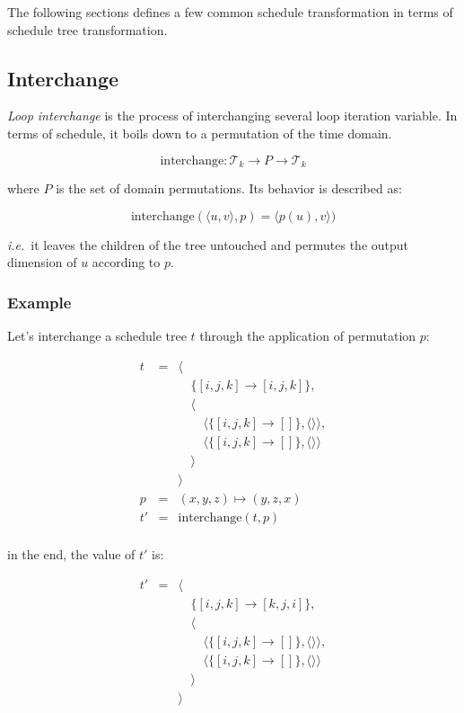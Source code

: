 \documentclass{article}
\begin{document}
The following sections defines a few common schedule transformation in terms of schedule tree transformation.

\subsection{Interchange}

\emph{Loop interchange} is the process of interchanging several loop iteration
variable. In terms of schedule, it boils down to a permutation of the time
domain.

\[
    \mathrm{interchange}: \mathcal{T}_k \rightarrow P \rightarrow \mathcal{T}_k
\]

\noindent where $P$ is the set of domain permutations. Its behavior is described as:

\[
    \mathrm{interchange}(\langle u, v\rangle, p) = \langle p(u), v\rangle)
\]

\noindent \emph{i.e.}\ it leaves the children of the tree untouched and
permutes the output dimension of $u$ according to $p$.

\subsubsection*{Example}

Let's interchange a schedule tree $t$ through the application of permutation $p$:

\[
    \begin{array}{lcl}
        t &=& \langle \\
          & & \quad\{[i,j,k] \rightarrow [i,j,k] \},\\
          & & \quad\langle \\
          & & \quad\quad \langle\{ [i,j,k] \rightarrow [] \}, \langle\rangle\rangle,\\
          & & \quad\quad \langle\{ [i,j,k] \rightarrow [] \}, \langle\rangle\rangle\\
          & & \quad\rangle \\
          & & \rangle \\
        p &=& (x, y, z) \mapsto (y, z, x) \\
        t'&=& \mathrm{interchange}(t, p) \\
    \end{array}
\]

\noindent in the end, the value of $t'$ is:

\[
    \begin{array}{lcl}
        t'&=& \langle \\
          & & \quad\{[i,j,k] \rightarrow [k,j,i] \},\\
          & & \quad\langle \\
          & & \quad\quad \langle\{ [i,j,k] \rightarrow [] \}, \langle\rangle\rangle,\\
          & & \quad\quad \langle\{ [i,j,k] \rightarrow [] \}, \langle\rangle\rangle\\
          & & \quad\rangle \\
          & & \rangle \\
    \end{array}
\]
\end{document}
